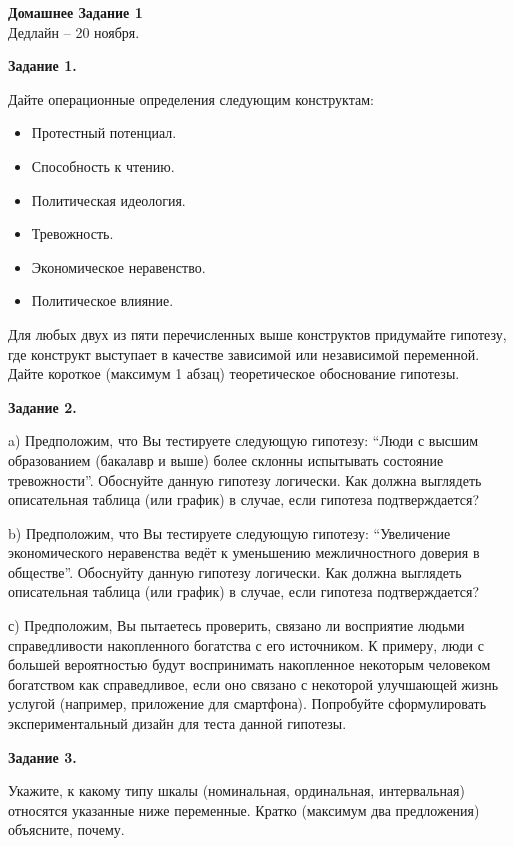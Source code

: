 \documentclass[12pt]{article}
\begin{document}
\begin{center}
\huge \textbf{Домашнее Задание 1} \\
\normalsize Дедлайн -- 20 ноября.  
\end{center}

\textbf{Задание 1.}

Дайте операционные определения следующим конструктам: 

\begin{itemize}
\item Протестный потенциал.
\item Способность к чтению. 
\item Политическая идеология.
\item Тревожность. 
\item Экономическое неравенство. 
\item Политическое влияние. 
\end{itemize}

Для любых двух из пяти перечисленных выше конструктов придумайте гипотезу, где конструкт выступает в качестве зависимой или независимой переменной.  Дайте короткое (максимум 1 абзац) теоретическое обоснование гипотезы. 

\textbf{Задание 2.}

a) Предположим,  что Вы тестируете следующую гипотезу: ``Люди с высшим образованием (бакалавр и выше) более склонны испытывать состояние тревожности''.   Обоснуйте данную гипотезу логически.  Как должна выглядеть описательная таблица (или график) в случае,  если гипотеза подтверждается? 

b) Предположим,  что Вы тестируете следующую гипотезу: ``Увеличение экономического неравенства ведёт к уменьшению межличностного доверия в обществе''.  Обоснуйту данную гипотезу логически.  Как должна выглядеть описательная таблица (или график) в случае,  если гипотеза подтверждается? 

с) Предположим,  Вы пытаетесь проверить,  связано ли восприятие людьми справедливости накопленного богатства с его источником.  К примеру,  люди с большей вероятностью будут воспринимать накопленное некоторым человеком богатством как справедливое,  если оно связано с некоторой улучшающей жизнь услугой (например, приложение для смартфона).  Попробуйте сформулировать экспериментальный дизайн для теста данной гипотезы. 

\textbf{Задание 3.}

Укажите,  к какому типу шкалы (номинальная,  ординальная,  интервальная) относятся указанные ниже переменные.  Кратко (максимум два предложения) объясните,  почему. 
\end{document}
